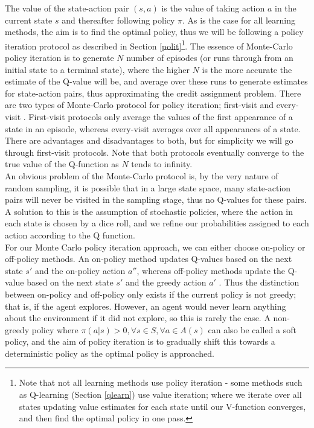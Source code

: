 \documentclass[12pt]{article}
\begin{document}
The value of the state-action pair $(s,a)$ is the value of taking action $a$ in the current state $s$ and thereafter following policy $\pi$. As is the case for all learning methods, the aim is to find the optimal policy, thus we will be following a policy iteration protocol as described in Section \ref{polit}\footnote[2]{Note that not all learning methods use policy iteration - some methods such as Q-learning (Section \ref{qlearn}) use value iteration; where we iterate over all states updating value estimates for each state until our V-function converges, and then find the optimal policy in one pass.}. The essence of Monte-Carlo policy iteration is to generate $N$ number of episodes (or runs through from an initial state to a terminal state), where the higher $N$ is the more accurate the estimate of the Q-value will be, and average over these runs to generate estimates for state-action pairs, thus approximating the credit assignment problem. There are two types of Monte-Carlo protocol for policy iteration; first-visit and every-visit \autocite{pmlr-v29-Wirth13}. First-visit protocols only average the values of the first appearance of a state in an episode, whereas every-visit averages over all appearances of a state. There are advantages and disadvantages to both, but for simplicity we will go through first-visit protocols. Note that both protocols eventually converge to the true value of the Q-function as $N$ tends to infinity.\\\newline
An obvious problem of the Monte-Carlo protocol is, by the very nature of random sampling, it is possible that in a large state space, many state-action pairs will never be visited in the sampling stage, thus no Q-values for these pairs. A solution to this is the assumption of stochastic policies, where the action in each state is chosen by a dice roll, and we refine our probabilities assigned to each action according to the Q function. \\\newline
For our Monte Carlo policy iteration approach, we can either choose on-policy or off-policy methods. An on-policy method updates Q-values based on the next state $s'$ and the on-policy action $a''$, whereas off-policy methods update the Q-value based on the next state $s'$ and the greedy action $a'$ \autocite{rlintrochap5}. Thus the distinction between on-policy and off-policy only exists if the current policy is not greedy; that is, if the agent explores. However, an agent would never learn anything about the environment if it did not explore, so this is rarely the case. A non-greedy policy where $\pi(a|s) > 0 ,\forall s \in S, \forall a \in A(s)$ can also be called a soft policy, and the aim of policy iteration is to gradually shift this towards a deterministic policy as the optimal policy is approached.
\end{document}
